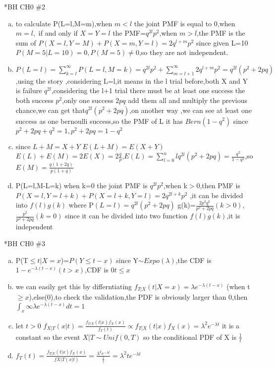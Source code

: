 \documentclass{article}
\begin{document}
\begin{homeworkProblem}*{BH CH0 \#2}
\begin{enumerate}[(a)]
\item  to calculate P(L=l,M=m),when $m<l$ the joint PMF is equal to 0,when $m=l,$ if and only if $X=Y=l$ the PMF=$q^{2l}p^2$,when $m>l$,the PMF is the sum of $P(X=l,Y=M)+P(X=m,Y=l)=2q^{l+m}p^2$ since given L=10 $P(M=5|L=10)=0,P(M=5)\neq 0$,so they are not independent.
\item $P(L=l)=\sum\limits_{k=l}^{\infty} P(L=l,M=k)=q^{2l}p^2+\sum\limits_{m=l+1}^{\infty}2q^{l+m}p^{2}=q^{2l}(p^2+2pq)$ ,using the story ,considering L=l,it means in the l trial before,both X and Y is failure $q^{2l}$,considering the l+1 trial there must be at least one success the both success $p^2$,only one success $2pq$ add them all and multiply the previous chance,we can get that$q^{2l}(p^2+2pq)$,on another way ,we can see at least one success as one bernoulli success,so the PMF of L it has $Bern(1-q^2)$ since $p^{2}+2pq+q^{2}=1,p^{2}+2pq=1-q^{2}$
\item since $L+M=X+Y$ $E(L+M)=E(X+Y)$$E(L)+E(M)=2E(X)=2\frac{q}{p}$,$E(L)=\sum\limits_{l=0}^{n}lq^{2l}(p^2+2pq)=\frac{q^2}{1-q^2}$,so $E(M)=\frac{q(1+2q)}{p(1+q
)} $ 
\item P(L=l,M-L=k) when k=0 the joint PMF is $q^{2l}p^2$,when k$>0$,then PMF is $P(X=l,Y=l+k)+P(X=l+k,Y=l)=2q^{2l+k}p^2$ ,it can be divided into $f(l)g(k)$ where P$(L=l)=q^{2l}(p^2+2pq)$ g(k)=$\frac{2p^2q^{k}}{p^2+2pq}(k>0)$,$\frac{p^2}{p^2+2pq}(k=0)$ since it can be divided into two function $f(l)g(k)$,it is independent
\end{enumerate}
\end{homeworkProblem}


\begin{homeworkProblem}*{BH CH0 \#3}
\begin{enumerate}[(a)]
	\item P(T$\leq t|X=x$)=$P(Y\leq t-x)$ since Y$\sim Expo(\lambda)$,the CDF is $1-e^{-\lambda(t-x)} $$(t> x)$,CDF is 0$t\leq x$
	\item we can easily get this by differntiating $f_{T|X}(t|X=x)=\lambda e^{-\lambda(t-x)}$ (when t$\geq x$),else(0),to check the validation,the PDF is obviously larger than 0,then $\int _{x}{\infty}\lambda e^{-\lambda(t-x)}dt=1$
\item let $t>0$ $f_{X|T}(x|t)=\frac{f_{T|X}(t|x)f_X(x)}{f_{T}(t)}\propto f_{T|X}(t|x)f_{X}(x)=\lambda^{2}e^{-\lambda t} $ it is a constant so the event $X|T\sim Unif(0,T)$ so the conditional PDF of X is $\frac{1}{t}$
\item $f_T(t)=\frac{f_{T|X}(t|x)f_{X}(x)}{f{X|T}(x|t)}=\frac{\lambda^2e^{-\lambda t}}{\frac{1}{t}}=\lambda^{2}te^{-\lambda t}$
\end{enumerate}
\end{homeworkProblem}
\end{document}
